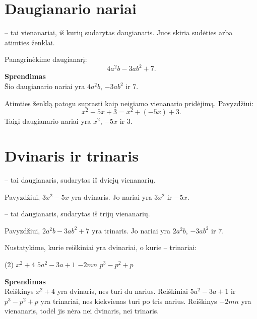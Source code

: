 \documentclass[11pt,a4paper]{scrartcl}
\begin{document}
\section{Daugianario nariai}

\begin{definition}
 -- tai vienanariai, iš kurių sudarytas daugianaris. Juos skiria sudėties arba atimties ženklai.
\end{definition}

\begin{example}
Panagrinėkime daugianarį:
\[
4a^2b-3ab^2+7.
\]
\textbf{Sprendimas}\\
Šio daugianario nariai yra $4a^2b$, $-3ab^2$ ir $7$.
\end{example}

\begin{remark}
Atimties ženklą patogu suprasti kaip neigiamo vienanario pridėjimą. Pavyzdžiui:
\[
x^2-5x+3=x^2+(-5x)+3.
\]
Taigi daugianario nariai yra $x^2$, $-5x$ ir $3$.
\end{remark}

\section{Dvinaris ir trinaris}

\begin{definition}
 -- tai daugianaris, sudarytas iš dviejų vienanarių.
\end{definition}

Pavyzdžiui, $3x^2-5x$ yra dvinaris. Jo nariai yra $3x^2$ ir $-5x$.

\begin{definition}
 -- tai daugianaris, sudarytas iš trijų vienanarių.
\end{definition}

Pavyzdžiui, $2a^2b-3ab^2+7$ yra trinaris. Jo nariai yra $2a^2b$, $-3ab^2$ ir $7$.

\begin{example}
Nustatykime, kurie reiškiniai yra dvinariai, o kurie -- trinariai:
\begin{tasks}[style=itemize](2)
	\task $x^2+4$
	\task $5a^2-3a+1$
	\task $-2mn$
	\task $p^3-p^2+p$
\end{tasks}
\textbf{Sprendimas}\\
Reiškinys $x^2+4$ yra dvinaris, nes turi du narius. Reiškiniai $5a^2-3a+1$ ir $p^3-p^2+p$ yra trinariai, nes kiekvienas turi po tris narius. Reiškinys $-2mn$ yra vienanaris, todėl jis nėra nei dvinaris, nei trinaris.
\end{example}
\end{document}
